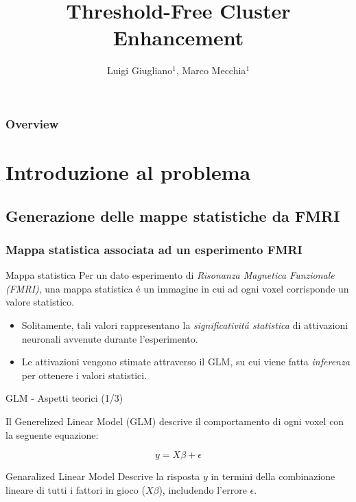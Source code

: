 \documentclass{beamer}
\title{Threshold-Free Cluster Enhancement}
\author{Luigi Giugliano$^1$, Marco Mecchia$^1$}
\institute{$^1$Università degli studi di Salerno}
\begin{document}
\begin{frame}
   \maketitle
\end{frame}

\begin{frame}
  \frametitle{Overview}
  \footnotesize \tableofcontents
\end{frame}


\section{Introduzione al problema}

\subsection{Generazione delle mappe statistiche da FMRI}

\begin{frame}
\frametitle{Mappa statistica associata ad un esperimento FMRI}
\begin{block}{Mappa statistica}
Per un dato esperimento di \emph{Risonanza Magnetica Funzionale (FMRI)}, una \alert{mappa statistica} \'e un immagine in cui ad ogni voxel corrisponde un valore statistico.
\end{block}
\begin{itemize}
\item Solitamente, tali valori rappresentano la \emph{significativit\'a statistica} di attivazioni neuronali avvenute durante l'esperimento.
\item Le attivazioni vengono stimate attraverso il \alert{GLM}, su cui viene fatta \emph{inferenza} per ottenere i valori statistici.
\end{itemize}
\end{frame}
\begin{frame}{GLM - Aspetti teorici (1/3)}

Il \alert{Generelized Linear Model (GLM)} descrive il comportamento di ogni voxel con la seguente equazione:

$$y = X\beta + \epsilon$$ 

\begin{block}{Genaralized Linear Model}
Descrive la risposta $y$ in termini della combinazione lineare di tutti i fattori in gioco ($X\beta$), includendo l'errore $\epsilon$.
\end{block}

\end{frame}
\end{document}
